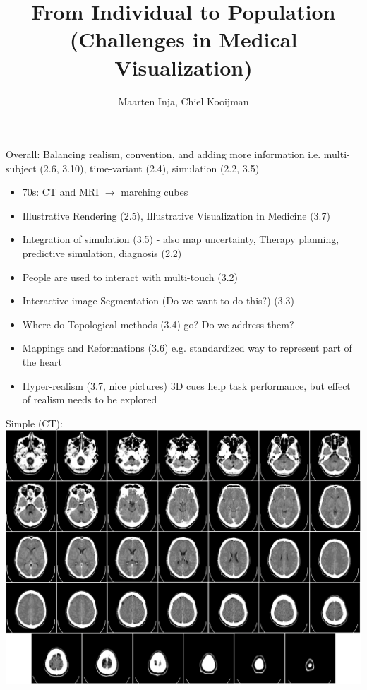 \documentclass{beamer}
\title{From Individual to Population\\(Challenges in Medical Visualization)}
\author{Maarten Inja, Chiel Kooijman}
\begin{document}
\begin{frame}
	\maketitle
\end{frame}

\begin{frame}
	Overall: Balancing realism, convention, and adding more information i.e.
	multi-subject (2.6, 3.10), time-variant (2.4), simulation (2.2, 3.5)\\
	
	\begin{itemize}
		\item 70s: CT and MRI $\rightarrow$ marching cubes\\
		\item Illustrative Rendering (2.5), Illustrative Visualization in
			Medicine (3.7)\\
		\item Integration of simulation (3.5) - also map uncertainty, Therapy
			planning, predictive simulation, diagnosis (2.2)\\

		\item People are used to interact with multi-touch (3.2)\\

		\item Interactive image Segmentation (Do we want to do this?) (3.3)\\

		\item Where do Topological methods (3.4) go? Do we address them?

		\item Mappings and Reformations (3.6) e.g. standardized way to
			represent part of the heart\\

		\item Hyper-realism (3.7, nice pictures) 3D cues help task performance,
			but effect of realism needs to be explored
	\end{itemize}
\end{frame}

\begin{frame}
	Simple (CT):\\
	\includegraphics[width=\textwidth]{images/ct}
\end{frame}
\end{document}
